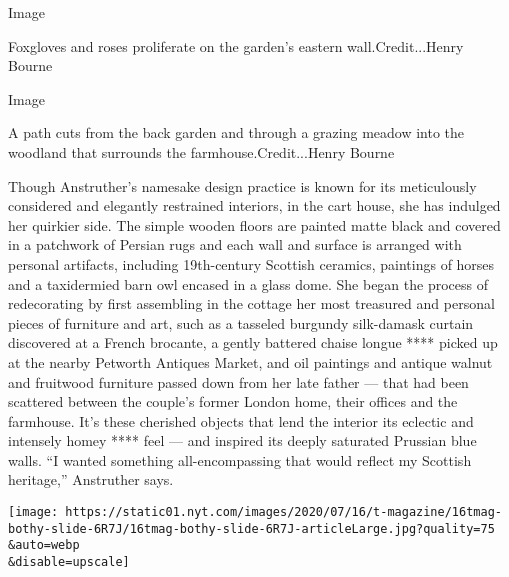 Image

Foxgloves and roses proliferate on the garden's eastern
wall.Credit...Henry Bourne

Image

A path cuts from the back garden and through a grazing meadow into the
woodland that surrounds the farmhouse.Credit...Henry Bourne

Though Anstruther's namesake design practice is known for its
meticulously considered and elegantly restrained interiors, in the cart
house, she has indulged her quirkier side. The simple wooden floors are
painted matte black and covered in a patchwork of Persian rugs and each
wall and surface is arranged with personal artifacts, including
19th-century Scottish ceramics, paintings of horses and a taxidermied
barn owl encased in a glass dome. She began the process of redecorating
by first assembling in the cottage her most treasured and personal
pieces of furniture and art, such as a tasseled burgundy silk-damask
curtain discovered at a French brocante, a gently battered chaise longue
**** picked up at the nearby Petworth Antiques Market, and oil paintings
and antique walnut and fruitwood furniture passed down from her late
father --- that had been scattered between the couple's former London
home, their offices and the farmhouse. It's these cherished objects that
lend the interior its eclectic and intensely homey **** feel --- and
inspired its deeply saturated Prussian blue walls. ``I wanted something
all-encompassing that would reflect my Scottish heritage,'' Anstruther
says.

\texttt{[image: https://static01.nyt.com/images/2020/07/16/t-magazine/16tmag-bothy-slide-6R7J/16tmag-bothy-slide-6R7J-articleLarge.jpg?quality=75\\\&auto=webp\\\&disable=upscale]}

